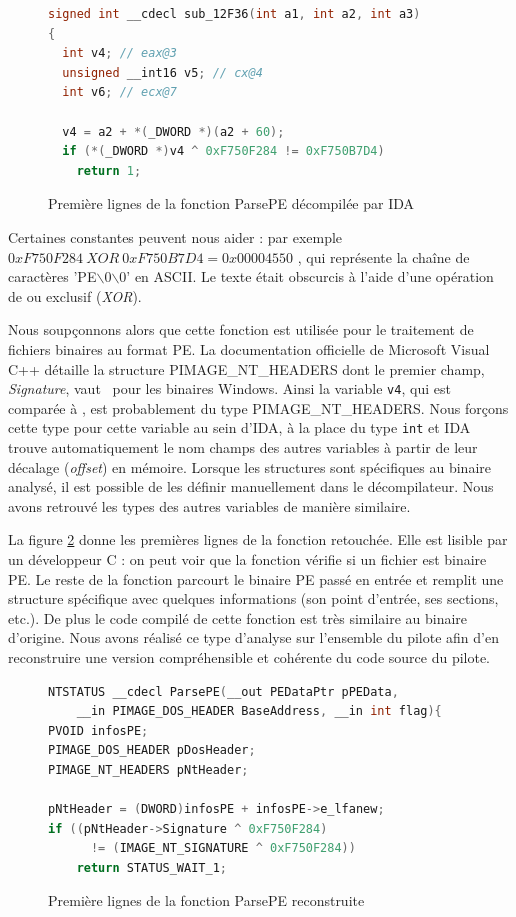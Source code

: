 \begin{figure}[h]
\begin{lstlisting}[language={C}]
signed int __cdecl sub_12F36(int a1, int a2, int a3)
{
  int v4; // eax@3
  unsigned __int16 v5; // cx@4
  int v6; // ecx@7

  v4 = a2 + *(_DWORD *)(a2 + 60);
  if (*(_DWORD *)v4 ^ 0xF750F284 != 0xF750B7D4)
    return 1;
\end{lstlisting}
\caption{Première lignes de la fonction ParsePE décompilée par IDA\label{fig:ParsePEInitial}}
\end{figure}

Certaines constantes peuvent nous aider : par exemple $0xF750F284\ XOR\ 0xF750B7D4 = 0x00004550$ , qui représente la chaîne de caractères 'PE$\backslash$0$\backslash$0' en ASCII. Le texte était obscurcis à l'aide d'une opération de ou exclusif (\emph{XOR}).

Nous soupçonnons alors que cette fonction est utilisée pour le traitement de fichiers binaires au format PE.
La documentation officielle de Microsoft Visual C++ détaille la structure PIMAGE\_NT\_HEADERS dont le premier champ, \emph{Signature}, vaut \PEzz\ pour les binaires Windows.
Ainsi la variable \texttt{v4}, qui est comparée à \PEzz, est probablement du type PIMAGE\_NT\_HEADERS.
Nous forçons cette type pour cette variable au sein d'IDA, à la place du type \texttt{int} et IDA trouve automatiquement le nom champs des autres variables à partir de leur décalage (\emph{offset}) en mémoire.
Lorsque les structures sont spécifiques au binaire analysé, il est possible de les définir manuellement dans le décompilateur.
Nous avons retrouvé les types des autres variables de manière similaire.

La figure \ref{fig:ParsePEFinal} donne les premières lignes de la fonction retouchée.
Elle est lisible par un développeur C : on peut voir que la fonction vérifie si un fichier est binaire PE.
Le reste de la fonction parcourt le binaire PE passé en entrée et remplit une structure spécifique avec quelques informations (son point d'entrée, ses sections, etc.).
De plus le code compilé de cette fonction est très similaire au binaire d'origine.
Nous avons réalisé ce type d'analyse sur l'ensemble du pilote afin d'en reconstruire une version compréhensible et cohérente du code source du pilote.

\begin{figure}[h]
\begin{lstlisting}[language={C}]
NTSTATUS __cdecl ParsePE(__out PEDataPtr pPEData, 
    __in PIMAGE_DOS_HEADER BaseAddress, __in int flag){
PVOID infosPE;
PIMAGE_DOS_HEADER pDosHeader;
PIMAGE_NT_HEADERS pNtHeader;

pNtHeader = (DWORD)infosPE + infosPE->e_lfanew;
if ((pNtHeader->Signature ^ 0xF750F284) 
      != (IMAGE_NT_SIGNATURE ^ 0xF750F284)) 
    return STATUS_WAIT_1; 
\end{lstlisting}
\caption{Première lignes de la fonction ParsePE reconstruite\label{fig:ParsePEFinal}}
\end{figure}

